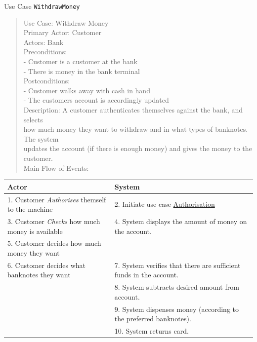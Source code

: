 \documentclass[10pt,t,a4paper]{beamer}
\begin{document}
\begin{frame}[fragile,shrink=15,label=sec-1-15]{Use Case \texttt{WithdrawMoney}}

 \begin{verse}
Use Case: Withdraw Money \\
Primary Actor: Customer \\
Actors: Bank \\
\vspace*{1em}
Preconditions: \\
- Customer is a customer at the bank \\
- There is money in the bank terminal \\
\vspace*{1em}
Postconditions: \\
- Customer walks away with cash in hand \\
- The customers account is accordingly updated \\
\vspace*{1em}
Description: A customer authenticates themselves against the bank, and selects \\
\hspace*{2em}how much money they want to withdraw and in what types of banknotes. The system \\
\hspace*{2em}updates the account (if there is enough money) and gives the money to the customer. \\
\vspace*{1em}
Main Flow of Events: \\
\end{verse}
\begin{center}
\begin{tabular}{ll}
Actor & System\\
\hline
1. Customer \emph{Authorises} themself to the machine & 2. Initiate use case \uline{Authorisation}\\
3. Customer \emph{Checks} how much money is available & 4. System displays the amount of money on the account.\\
5. Customer decides how much money they want & \\
6. Customer decides what banknotes they want & 7. System verifies that there are sufficient funds in the account.\\
 & 8. System subtracts desired amount from account.\\
 & 9. System dispenses money (according to the preferred banknotes).\\
 & 10. System returns card.\\

\end{tabular}
\end{center}
\end{frame}
\end{document}
